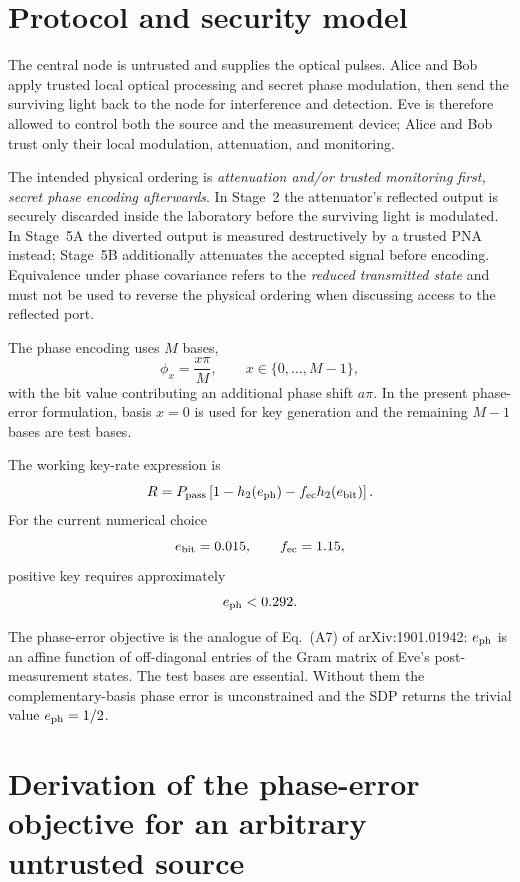 \documentclass[11pt]{article}
\theoremstyle{remark}
\begin{document}
\section{Protocol and security model}

The central node is untrusted and supplies the optical pulses. Alice and Bob
apply trusted local optical processing and secret phase modulation, then send
the surviving light back to the node for interference and detection. Eve is
therefore allowed to control both the source and the measurement device;
Alice and Bob trust only their local modulation, attenuation, and monitoring.

The intended physical ordering is \emph{attenuation and/or trusted monitoring
first, secret phase encoding afterwards}.  In Stage~2 the attenuator's
reflected output is securely discarded inside the laboratory before the
surviving light is modulated.  In Stage~5A the diverted output is measured
destructively by a trusted PNA instead; Stage~5B additionally attenuates the
accepted signal before encoding.  Equivalence under phase covariance refers
to the \emph{reduced transmitted state} and must not be used to reverse the
physical ordering when discussing access to the reflected port.

The phase encoding uses \(M\) bases,
\[
    \phi_x = \frac{x\pi}{M},
    \qquad x\in\{0,\ldots,M-1\},
\]
with the bit value contributing an additional phase shift \(a\pi\). In the
present phase-error formulation, basis \(x=0\) is used for key generation and
the remaining \(M-1\) bases are test bases.

The working key-rate expression is
\begin{equation}
    R = P_{\rm pass}
    \left[
        1-h_2(e_{\rm ph})
        -f_{\rm ec}h_2(e_{\rm bit})
    \right].
\end{equation}
For the current numerical choice
\[
    e_{\rm bit}=0.015,
    \qquad
    f_{\rm ec}=1.15,
\]
positive key requires approximately
\[
    e_{\rm ph}<0.292.
\]

The phase-error objective is the analogue of Eq.~(A7) of
arXiv:1901.01942: \(e_{\rm ph}\) is an affine function of off-diagonal
entries of the Gram matrix of Eve's post-measurement states. The test bases
are essential. Without them the complementary-basis phase error is
unconstrained and the SDP returns the trivial value \(e_{\rm ph}=1/2\).

\section{Derivation of the phase-error objective for an arbitrary untrusted source}
\label{sec:a7-general}
\end{document}
